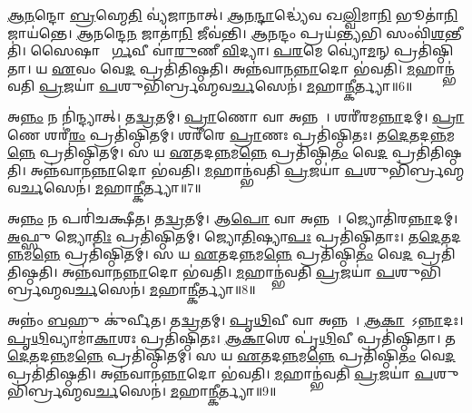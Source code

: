 \ul{𑌆}\ul{𑌨}𑌨𑍍𑌦𑍋 \ul{𑌬𑍍𑌰}𑌹𑍍𑌮𑍇\ul{𑌤𑌿} 𑌵𑍍𑌯॑𑌜𑌾𑌨𑌾𑌤𑍍। 
\ul{𑌆}𑌨\ul{𑌨𑍍𑌦𑌾}𑌦𑍍𑌧𑍍𑌯𑍇॑𑌵 𑌖\ul{𑌲𑍍𑌵𑌿}𑌮𑌾\ul{𑌨𑌿} 𑌭𑍂𑌤𑌾॑\ul{𑌨𑌿} 𑌜𑌾𑌯॑𑌨𑍍𑌤𑍇। 
\ul{𑌆}\ul{𑌨}𑌨𑍍𑌦𑍇\ul{𑌨} 𑌜𑌾𑌤𑌾॑\ul{𑌨𑌿} 𑌜𑍀𑌵॑𑌨𑍍𑌤𑌿। 
\ul{𑌆}\ul{𑌨}𑌨𑍍𑌦𑌂 𑌪𑍍𑌰𑌯॑\ul{𑌨𑍍𑌤𑍍𑌯}𑌭𑌿 𑌸𑌂𑌵𑌿॑\ul{𑌶}𑌨𑍍𑌤𑍀𑌤𑌿॑। 
𑌸𑍈𑌷𑌾 𑌭𑌾᳚\ul{𑌰𑍍𑌗}𑌵𑍀 𑌵𑌾॑\ul{𑌰𑍁}𑌣𑍀 \ul{𑌵𑌿}𑌦𑍍𑌯𑌾। 
\ul{𑌪}\ul{𑌰}𑌮𑍇 𑌵𑍍𑌯𑍋॑\ul{𑌮}𑌨𑍍 𑌪𑍍𑌰𑌤𑌿॑𑌷𑍍𑌠𑌿𑌤𑌾। 
𑌯 \ul{𑌏}𑌵𑌂 𑌵𑍇\ul{𑌦} 𑌪𑍍𑌰𑌤𑌿॑𑌤𑌿𑌷𑍍𑌠𑌤𑌿। 
𑌅𑌨𑍍𑌨॑𑌵𑌾𑌨\ul{𑌨𑍍𑌨𑌾}𑌦𑍋 𑌭॑𑌵𑌤𑌿। 
\ul{𑌮}𑌹𑌾𑌨𑍍𑌭॑𑌵𑌤𑌿 \ul{𑌪𑍍𑌰}𑌜𑌯𑌾॑ \ul{𑌪}𑌶𑍁𑌭𑌿॑𑌰𑍍𑌬𑍍𑌰𑌹𑍍𑌮𑌵\ul{𑌰𑍍𑌚}𑌸𑍇𑌨॑। 
\ul{𑌮}𑌹𑌾\ul{𑌨𑍍𑌕𑍀}𑌰𑍍𑌤𑍍𑌯𑌾॥6॥

𑌅\ul{𑌨𑍍𑌨𑌂} 𑌨 𑌨𑌿॑𑌨𑍍𑌦𑍍𑌯𑌾𑌤𑍍। 
𑌤\ul{𑌦𑍍𑌵𑍍𑌰}𑌤𑌮𑍍। 
\ul{𑌪𑍍𑌰𑌾}𑌣𑍋 𑌵𑌾 𑌅𑌨𑍍𑌨𑌮𑍍᳚। 
𑌶𑌰𑍀॑𑌰𑌮\ul{𑌨𑍍𑌨𑌾}𑌦𑌮𑍍। 
\ul{𑌪𑍍𑌰𑌾}𑌣𑍇 𑌶𑌰𑍀॑\ul{𑌰𑌂} 𑌪𑍍𑌰𑌤𑌿॑𑌷𑍍𑌠𑌿𑌤𑌮𑍍। 
𑌶𑌰𑍀॑𑌰𑍇 \ul{𑌪𑍍𑌰𑌾}𑌣𑌃 𑌪𑍍𑌰𑌤𑌿॑𑌷𑍍𑌠𑌿𑌤𑌃। 
𑌤\ul{𑌦𑍇}𑌤𑌦\ul{𑌨𑍍𑌨}𑌮\ul{𑌨𑍍𑌨𑍇} 𑌪𑍍𑌰𑌤𑌿॑𑌷𑍍𑌠𑌿𑌤𑌮𑍍। 
𑌸 𑌯 \ul{𑌏}𑌤𑌦\ul{𑌨𑍍𑌨}𑌮\ul{𑌨𑍍𑌨𑍇} 𑌪𑍍𑌰𑌤𑌿॑𑌷𑍍𑌠𑌿\ul{𑌤𑌂} 𑌵𑍇\ul{𑌦} 𑌪𑍍𑌰𑌤𑌿॑𑌤𑌿𑌷𑍍𑌠𑌤𑌿। 
𑌅𑌨𑍍𑌨॑𑌵𑌾𑌨\ul{𑌨𑍍𑌨𑌾}𑌦𑍋 𑌭॑𑌵𑌤𑌿। 
\ul{𑌮}𑌹𑌾𑌨𑍍𑌭॑𑌵𑌤𑌿 \ul{𑌪𑍍𑌰}𑌜𑌯𑌾॑ \ul{𑌪}𑌶𑍁𑌭𑌿॑𑌰𑍍𑌬𑍍𑌰𑌹𑍍𑌮𑌵\ul{𑌰𑍍𑌚}𑌸𑍇𑌨॑। 
\ul{𑌮}𑌹𑌾\ul{𑌨𑍍𑌕𑍀}𑌰𑍍𑌤𑍍𑌯𑌾॥7॥

𑌅\ul{𑌨𑍍𑌨𑌂} 𑌨 𑌪𑌰𑌿॑𑌚𑌕𑍍𑌷𑍀𑌤। 
𑌤\ul{𑌦𑍍𑌵𑍍𑌰}𑌤𑌮𑍍। 
𑌆\ul{𑌪𑍋} 𑌵𑌾 𑌅𑌨𑍍𑌨𑌮𑍍᳚। 
𑌜𑍍𑌯𑍋𑌤𑌿॑𑌰\ul{𑌨𑍍𑌨𑌾}𑌦𑌮𑍍। 
\ul{𑌅}𑌫𑍍𑌸𑍁 𑌜𑍍𑌯𑍋\ul{𑌤𑌿𑌃} 𑌪𑍍𑌰𑌤𑌿॑𑌷𑍍𑌠𑌿𑌤𑌮𑍍। 
𑌜𑍍𑌯𑍋\ul{𑌤𑌿}𑌷𑍍𑌯𑌾\ul{𑌪𑌃} 𑌪𑍍𑌰𑌤𑌿॑𑌷𑍍𑌠𑌿𑌤𑌾𑌃। 
𑌤\ul{𑌦𑍇}𑌤𑌦\ul{𑌨𑍍𑌨}𑌮\ul{𑌨𑍍𑌨𑍇} 𑌪𑍍𑌰𑌤𑌿॑𑌷𑍍𑌠𑌿𑌤𑌮𑍍। 
𑌸 𑌯 \ul{𑌏}𑌤𑌦\ul{𑌨𑍍𑌨}𑌮\ul{𑌨𑍍𑌨𑍇} 𑌪𑍍𑌰𑌤𑌿॑𑌷𑍍𑌠𑌿\ul{𑌤𑌂} 𑌵𑍇\ul{𑌦} 𑌪𑍍𑌰𑌤𑌿॑𑌤𑌿𑌷𑍍𑌠𑌤𑌿। 
𑌅𑌨𑍍𑌨॑𑌵𑌾𑌨\ul{𑌨𑍍𑌨𑌾}𑌦𑍋 𑌭॑𑌵𑌤𑌿। 
\ul{𑌮}𑌹𑌾𑌨𑍍𑌭॑𑌵𑌤𑌿 \ul{𑌪𑍍𑌰}𑌜𑌯𑌾॑ \ul{𑌪}𑌶𑍁𑌭𑌿॑𑌰𑍍𑌬𑍍𑌰𑌹𑍍𑌮𑌵\ul{𑌰𑍍𑌚}𑌸𑍇𑌨॑। 
\ul{𑌮}𑌹𑌾\ul{𑌨𑍍𑌕𑍀}𑌰𑍍𑌤𑍍𑌯𑌾॥8॥

𑌅𑌨𑍍𑌨𑌂॑ \ul{𑌬}𑌹𑍁 𑌕𑍁॑𑌰𑍍𑌵𑍀𑌤। 
𑌤\ul{𑌦𑍍𑌵𑍍𑌰}𑌤𑌮𑍍। 
\ul{𑌪𑍃}\ul{𑌥𑌿}𑌵𑍀 𑌵𑌾 𑌅𑌨𑍍𑌨𑌮𑍍᳚। 
\ul{𑌆}\ul{𑌕𑌾}𑌶𑍋᳚𑌽\ul{𑌨𑍍𑌨𑌾}𑌦𑌃। 
\ul{𑌪𑍃}\ul{𑌥𑌿}𑌵𑍍𑌯𑌾𑌮𑌾॑\ul{𑌕𑌾}𑌶𑌃 𑌪𑍍𑌰𑌤𑌿॑𑌷𑍍𑌠𑌿𑌤𑌃। 
\ul{𑌆}\ul{𑌕𑌾}𑌶𑍇 𑌪𑍃॑\ul{𑌥𑌿}𑌵𑍀 𑌪𑍍𑌰𑌤𑌿॑𑌷𑍍𑌠𑌿𑌤𑌾। 
𑌤\ul{𑌦𑍇}𑌤𑌦\ul{𑌨𑍍𑌨}𑌮\ul{𑌨𑍍𑌨𑍇} 𑌪𑍍𑌰𑌤𑌿॑𑌷𑍍𑌠𑌿𑌤𑌮𑍍। 
𑌸 𑌯 \ul{𑌏}𑌤𑌦\ul{𑌨𑍍𑌨}𑌮\ul{𑌨𑍍𑌨𑍇} 𑌪𑍍𑌰𑌤𑌿॑𑌷𑍍𑌠𑌿\ul{𑌤𑌂} 𑌵𑍇\ul{𑌦} 𑌪𑍍𑌰𑌤𑌿॑𑌤𑌿𑌷𑍍𑌠𑌤𑌿। 
𑌅𑌨𑍍𑌨॑𑌵𑌾𑌨\ul{𑌨𑍍𑌨𑌾}𑌦𑍋 𑌭॑𑌵𑌤𑌿। 
\ul{𑌮}𑌹𑌾𑌨𑍍𑌭॑𑌵𑌤𑌿 \ul{𑌪𑍍𑌰}𑌜𑌯𑌾॑ \ul{𑌪}𑌶𑍁𑌭𑌿॑𑌰𑍍𑌬𑍍𑌰𑌹𑍍𑌮𑌵\ul{𑌰𑍍𑌚}𑌸𑍇𑌨॑। 
\ul{𑌮}𑌹𑌾\ul{𑌨𑍍𑌕𑍀}𑌰𑍍𑌤𑍍𑌯𑌾॥9॥

